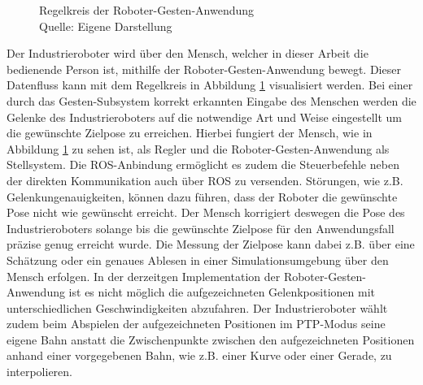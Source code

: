 \begin{figure}[!h]
\newline
    \caption[Regelkreis der Roboter-Gesten-Anwendung]{Regelkreis der Roboter-Gesten-Anwendung\\Quelle: Eigene Darstellung}
    \label{fig:regelkreis_tir}
\end{figure}\FloatBarrier

Der Industrieroboter wird über den Mensch, welcher in dieser Arbeit die bedienende Person ist, mithilfe der Roboter-Gesten-Anwendung bewegt. Dieser Datenfluss kann mit dem Regelkreis in Abbildung \ref{fig:regelkreis_tir} visualisiert werden. Bei einer durch das Gesten-Subsystem korrekt erkannten Eingabe des Menschen werden die Gelenke des Industrieroboters auf die notwendige Art und Weise eingestellt um die gewünschte Zielpose zu erreichen. Hierbei fungiert der Mensch, wie in Abbildung \ref{fig:regelkreis_tir} zu sehen ist, als Regler und die Roboter-Gesten-Anwendung als Stellsystem. Die ROS-Anbindung ermöglicht es zudem die Steuerbefehle neben der direkten Kommunikation auch über ROS zu versenden. Störungen, wie z.B. Gelenkungenauigkeiten, können dazu führen, dass der Roboter die gewünschte Pose nicht wie gewünscht erreicht. Der Mensch korrigiert deswegen die Pose des Industrieroboters solange bis die gewünschte Zielpose für den Anwendungsfall präzise genug erreicht wurde. Die Messung der Zielpose kann dabei z.B. über eine Schätzung oder ein genaues Ablesen in einer Simulationsumgebung über den Mensch erfolgen. In der derzeitgen Implementation der Roboter-Gesten-Anwendung ist es nicht möglich die aufgezeichneten Gelenkpositionen mit unterschiedlichen Geschwindigkeiten abzufahren. Der Industrieroboter wählt zudem beim Abspielen der aufgezeichneten Positionen im PTP-Modus seine eigene Bahn anstatt die Zwischenpunkte zwischen den aufgezeichneten Positionen anhand einer vorgegebenen Bahn, wie z.B. einer Kurve oder einer Gerade, zu interpolieren.

